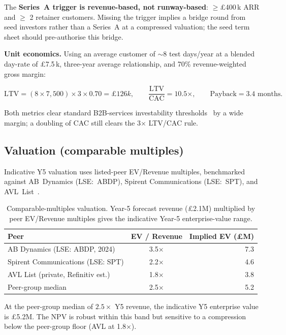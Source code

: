 \documentclass[11pt, a4paper]{report}
\numberwithin{equation}{section}
\newcommand{\ltv}{\pounds126k\xspace}
\newcommand{\ltvCac}{10.5\ensuremath{\times}\xspace}
\newcommand{\paybackMonths}{3.4\xspace}
\newcommand{\terminalValue}{\pounds5.2M\xspace}
\begin{document}
\begin{refsection}
\noindent The \textbf{Series~A trigger is revenue-based, not
runway-based}: $\geq$\pounds400\,k ARR and $\geq$ 2 retainer
customers. Missing the trigger implies a bridge round from seed
investors rather than a Series~A at a compressed valuation; the
seed term sheet should pre-authorise this bridge.

\medskip

\noindent \textbf{Unit economics.} Using an average customer of
$\sim$8 test days/year at a blended day-rate of \pounds7.5\,k,
three-year average relationship, and 70\% revenue-weighted gross
margin:

\begin{equation}
\mathrm{LTV} = (8 \times 7{,}500) \times 3 \times 0.70 = \ltv,
\qquad
\frac{\mathrm{LTV}}{\mathrm{CAC}} = \ltvCac,
\qquad
\mathrm{Payback} = \paybackMonths \text{ months}.
\end{equation}

Both metrics clear standard B2B-services investability
thresholds~\cite{gompers2020} by a wide margin; a doubling of CAC
still clears the 3$\times$ LTV/CAC rule.

\subsection{Valuation (comparable multiples)}
\label{sec:valuation}

Indicative Y5 valuation uses listed-peer EV/Revenue multiples,
benchmarked against AB~Dynamics (LSE:~ABDP), Spirent Communications
(LSE:~SPT), and AVL~List~\cite{abdynamics_ar2024,avl_profile}.

\begin{table}[H]
\centering
\small
\caption{Comparable-multiples valuation. Year-5 forecast revenue 
(\pounds2.1M) multiplied by peer EV/Revenue multiples 
gives the indicative Year-5 enterprise-value range.}
\label{tab:valuation}
\begin{tabular}{lcr}
\toprule
\textbf{Peer} & \textbf{EV / Revenue} & \textbf{Implied EV (\pounds M)} \\
\midrule
AB Dynamics (LSE: ABDP, 2024) & 3.5$\times$ & 7.3 \\
Spirent Communications (LSE: SPT) & 2.2$\times$ & 4.6 \\
AVL List (private, Refinitiv est.) & 1.8$\times$ & 3.8 \\
Peer-group median & 2.5$\times$ & 5.2 \\
\bottomrule
\end{tabular}
\end{table}
At the peer-group median of $2.5\times$ Y5 revenue, the indicative
Y5 enterprise value is \terminalValue. The NPV  is robust within this
band but sensitive to a compression below the peer-group floor
(AVL at 1.8$\times$).


\end{refsection}
\end{document}

